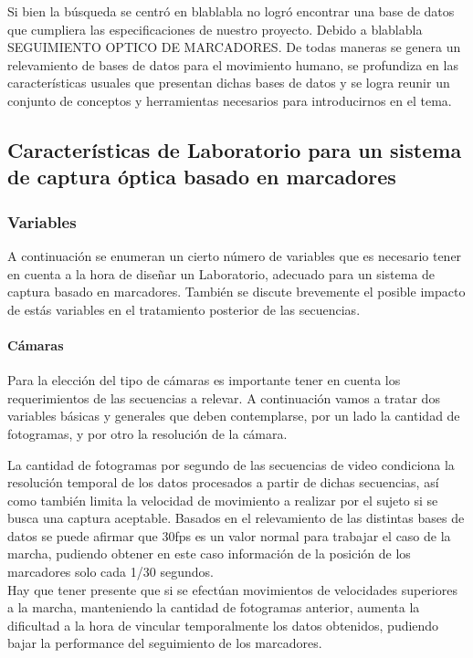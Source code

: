 Si bien la búsqueda se centró en blablabla no logró encontrar una base de datos que cumpliera las especificaciones de nuestro proyecto. Debido a blablabla SEGUIMIENTO OPTICO DE MARCADORES.
 De todas maneras se genera un relevamiento de bases de datos para el movimiento humano, se profundiza en las características usuales que presentan dichas bases de datos y se logra reunir un conjunto de conceptos y herramientas necesarios para introducirnos en el tema. 



\subsection{Características de Laboratorio para un sistema de captura óptica basado en marcadores}
\subsubsection{Variables}
 
A continuación se enumeran un cierto número de variables que es necesario tener en cuenta a la hora de diseñar un Laboratorio, adecuado para un sistema de captura basado en marcadores. También se discute brevemente el posible impacto de estás variables en el tratamiento posterior de las secuencias.

\paragraph{Cámaras}\label{parrafo_Camaras} 
Para la elección del tipo de cámaras es importante tener en cuenta los requerimientos de las secuencias a relevar. A continuación vamos a tratar dos variables básicas y generales que deben contemplarse, por un lado la cantidad de fotogramas, y por otro la resolución de la cámara.

La cantidad de fotogramas por segundo de las secuencias de video condiciona la resolución temporal de los datos procesados a partir de dichas secuencias, así como también limita la velocidad de movimiento a realizar por el sujeto si se busca una captura aceptable.
Basados en el relevamiento de las distintas bases de datos se puede afirmar que 30fps es un valor normal para trabajar el caso de la marcha, pudiendo obtener en este caso información de la posición de los marcadores solo cada 1/30 segundos.\\ 
Hay que tener presente que si se efectúan movimientos de velocidades superiores a la marcha, manteniendo la cantidad de fotogramas anterior, aumenta la dificultad a la hora de vincular temporalmente los datos obtenidos, pudiendo bajar la performance del seguimiento de los marcadores. 

